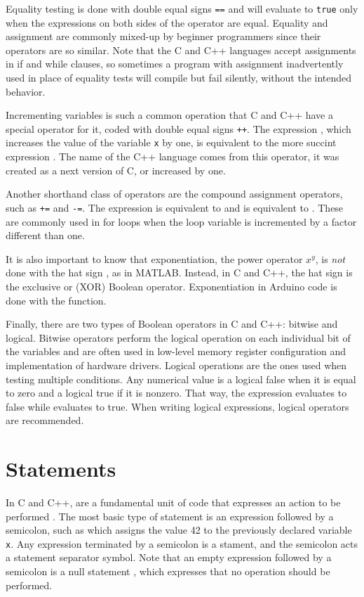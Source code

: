 Equality testing is done with double equal signs \texttt{==} and will evaluate to \texttt{true} only when the expressions on both sides of the operator are equal.
Equality and assignment are commonly mixed-up by beginner programmers since their operators are so similar.
Note that the C and C++ languages accept assignments in if and while clauses, so sometimes a program with assignment inadvertently used in place of equality tests will compile but fail silently, without the intended behavior.

Incrementing variables is such a common operation that C and C++ have a special operator for it, coded with double equal signs \texttt{++}.
The expression , which increases the value of the variable \texttt{x} by one, is equivalent to the more succint expression .
The name of the C++ language comes from this operator, it was created as a next version of C, or increased by one.

Another shorthand class of operators are the compound assignment operators, such as \texttt{+=} and \texttt{-=}.
The expression  is equivalent to  and  is equivalent to .
These are commonly used in for loops when the loop variable is incremented by a factor different than one.

It is also important to know that exponentiation, the power operator $x^y$, is \emph{not} done with the hat sign , as in MATLAB.
Instead, in C and C++, the hat sign  is the exclusive or (XOR) Boolean operator.
Exponentiation in Arduino code is done with the  function.

Finally, there are two types of Boolean operators in C and C++: bitwise and logical.
Bitwise operators perform the logical operation on each individual bit of the variables and are often used in low-level memory register configuration and implementation of hardware drivers.
Logical operations are the ones used when testing multiple conditions.
Any numerical value is a logical false when it is equal to zero and a logical true if it is nonzero.
That way, the expression  evaluates to false while  evaluates to true.
When writing logical expressions, logical operators are recommended.

\section{Statements}
In C and C++,  are a fundamental unit of code that expresses an action to be performed \cite[cl.~6.8]{C23}.
The most basic type of statement is an expression followed by a semicolon, such as  which assigns the value 42 to the previously declared variable \texttt{x}.
Any expression terminated by a semicolon is a stament, and the semicolon acts a statement separator symbol.
Note that an empty expression followed by a semicolon is a null statement \cite[cl.~6.8.3]{C23}, which expresses that no operation should be performed.

